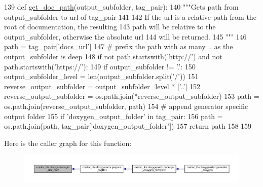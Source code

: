 \begin{DoxyCode}
139 \textcolor{keyword}{def }\hyperlink{namespacerosdoc__lite_1_1doxygenator_ac92aa7c3531b0bf1eb0c9a8b79f9120d}{get\_doc\_path}(output\_subfolder, tag\_pair):
140     \textcolor{stringliteral}{"""Gets path from output\_subfolder to url of tag\_pair}
141 \textcolor{stringliteral}{}
142 \textcolor{stringliteral}{    If the url is a relative path from the root of documentation, the resulting}
143 \textcolor{stringliteral}{    path will be relative to the output\_subfolder, otherwise the absolute url}
144 \textcolor{stringliteral}{    will be returned.}
145 \textcolor{stringliteral}{    """}
146     path = tag\_pair[\textcolor{stringliteral}{'docs\_url'}]
147     \textcolor{comment}{# prefix the path with as many .. as the output\_subfolder is deep}
148     \textcolor{keywordflow}{if} \textcolor{keywordflow}{not} path.startswith(\textcolor{stringliteral}{'http://'}) \textcolor{keywordflow}{and} \textcolor{keywordflow}{not} path.startswith(\textcolor{stringliteral}{'https://'}):
149         \textcolor{keywordflow}{if} output\_subfolder != \textcolor{stringliteral}{'.'}:
150             output\_subfolder\_level = len(output\_subfolder.split(\textcolor{stringliteral}{'/'}))
151             reverse\_output\_subfolder = output\_subfolder\_level * [\textcolor{stringliteral}{'..'}]
152             reverse\_output\_subfolder = os.path.join(*reverse\_output\_subfolder)
153             path = os.path.join(reverse\_output\_subfolder, path)
154     \textcolor{comment}{# append generator specific output folder}
155     \textcolor{keywordflow}{if} \textcolor{stringliteral}{'doxygen\_output\_folder'} \textcolor{keywordflow}{in} tag\_pair:
156         path = os.path.join(path, tag\_pair[\textcolor{stringliteral}{'doxygen\_output\_folder'}])
157     \textcolor{keywordflow}{return} path
158 
159 
\end{DoxyCode}


Here is the caller graph for this function\+:
\nopagebreak
\begin{figure}[H]
\begin{center}
\leavevmode
\includegraphics[width=350pt]{namespacerosdoc__lite_1_1doxygenator_ac92aa7c3531b0bf1eb0c9a8b79f9120d_icgraph}
\end{center}
\end{figure}


